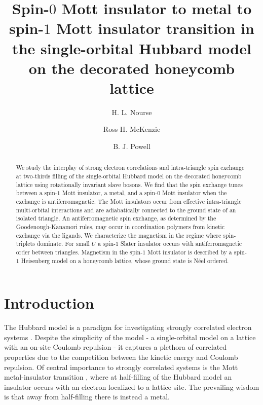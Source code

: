 \documentclass[reprint,aps,prb,amsmath,amssymb]{revtex4-2}
\begin{document}
\title{Spin-$0$ Mott insulator to metal to spin-$1$ Mott insulator transition in the single-orbital Hubbard model on the decorated honeycomb lattice}
\author{H. L. Nourse}
\author{Ross H. McKenzie}
\author{B. J. Powell}

\begin{abstract}
We study the interplay of strong electron correlations and intra-triangle spin exchange at two-thirds filling of the single-orbital Hubbard model on the decorated honeycomb lattice using rotationally invariant slave bosons. We find that the spin exchange tunes between a spin-$1$ Mott insulator, a metal, and a spin-$0$ Mott insulator when the exchange is antiferromagnetic. The Mott insulators occur from effective intra-triangle multi-orbital interactions and are adiabatically connected to the ground state of an isolated triangle. An antiferromagnetic spin exchange, as determined by the Goodenough-Kanamori rules, may occur in coordination polymers from kinetic exchange via the ligands. We characterize the magnetism in the regime where spin-triplets dominate. For small $U$ a spin-$1$ Slater insulator occurs with antiferromagnetic order between triangles. Magnetism in the spin-$1$ Mott insulator is described by a spin-$1$ Heisenberg model on a honeycomb lattice, whose ground state is N\'{e}el ordered.
\end{abstract}

\maketitle

\section{Introduction}

The Hubbard model is a paradigm for investigating strongly correlated electron systems \cite{Imada1998}. Despite the simplicity of the model - a single-orbital model on a lattice with an on-site Coulomb repulsion - it captures a plethora of correlated properties due to the competition between the kinetic energy and Coulomb repulsion. Of central importance to strongly correlated systems is the Mott metal-insulator transition \cite{Mott1968}, where at half-filling of the Hubbard model an insulator occurs with an electron localized to a lattice site. The prevailing wisdom is that away from half-filling there is instead a metal.
\end{document}
